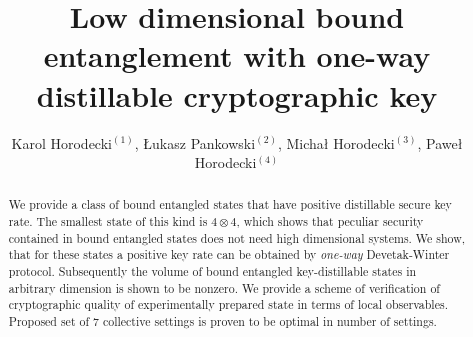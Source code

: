 \documentclass[twocolumn,prl,aps]{revtex4}
\begin{document}

\title{Low dimensional bound entanglement with one-way distillable 
cryptographic key}

\author{ Karol Horodecki$^{(1)}$, \L{}ukasz Pankowski$^{(2)}$, Micha\l{} Horodecki$^{(3)}$, Pawe\l{} Horodecki$^{(4)}$}







\begin{abstract}
We provide a class of bound entangled states  that have positive distillable secure key rate. 
The smallest state of this kind is $4 \otimes 4$, which shows that peculiar security 
contained in bound entangled states does not need  high dimensional systems. We show, that for 
these states a positive key rate can  be obtained by {\it one-way} Devetak-Winter 
protocol. Subsequently the volume of bound entangled key-distillable states in arbitrary  dimension 
is shown to be nonzero.  
We provide a scheme of verification of cryptographic quality of experimentally prepared  state in terms of local observables. Proposed set of $7$ collective settings is proven to be optimal in number of settings.
\end{abstract}


\maketitle
\end{document}
